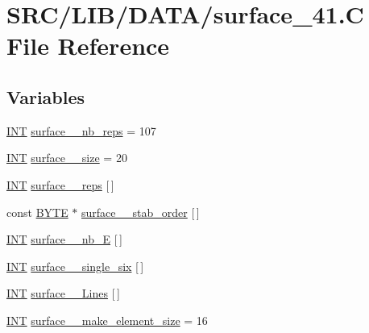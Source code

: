 \hypertarget{surface__41_8_c}{}\section{S\+R\+C/\+L\+I\+B/\+D\+A\+T\+A/surface\+\_\+41.C File Reference}
\label{surface__41_8_c}
\subsection*{Variables}
\begin{DoxyCompactItemize}
\item 
\mbox{\hyperlink{galois_8h_a09fddde158a3a20bd2dcadb609de11dc}{I\+NT}} \mbox{\hyperlink{surface__41_8_c_afb3c710b0a38cd5d7a817c53cffb5504}{surface\+\_\+\_\+nb\+\_\+reps}} = 107
\item 
\mbox{\hyperlink{galois_8h_a09fddde158a3a20bd2dcadb609de11dc}{I\+NT}} \mbox{\hyperlink{surface__41_8_c_a427593e153dddedf2a9f015444f2d298}{surface\+\_\+\_\+size}} = 20
\item 
\mbox{\hyperlink{galois_8h_a09fddde158a3a20bd2dcadb609de11dc}{I\+NT}} \mbox{\hyperlink{surface__41_8_c_a7be9eb6a20b2fcd1669a22e37e74dc1b}{surface\+\_\+\_\+reps}} \mbox{[}$\,$\mbox{]}
\item 
const \mbox{\hyperlink{galois_8h_ab6cc7b4aeb6ea31aba2b3fbfc83ff5e6}{B\+Y\+TE}} $\ast$ \mbox{\hyperlink{surface__41_8_c_a834534f74921072c78c7a682ac12512c}{surface\+\_\+\_\+stab\+\_\+order}} \mbox{[}$\,$\mbox{]}
\item 
\mbox{\hyperlink{galois_8h_a09fddde158a3a20bd2dcadb609de11dc}{I\+NT}} \mbox{\hyperlink{surface__41_8_c_ac1282a5a5512d1cb41af5b8118ec3f75}{surface\+\_\+\_\+nb\+\_\+E}} \mbox{[}$\,$\mbox{]}
\item 
\mbox{\hyperlink{galois_8h_a09fddde158a3a20bd2dcadb609de11dc}{I\+NT}} \mbox{\hyperlink{surface__41_8_c_a6645f57303c0dd2b59053b97b12cf214}{surface\+\_\+\_\+single\+\_\+six}} \mbox{[}$\,$\mbox{]}
\item 
\mbox{\hyperlink{galois_8h_a09fddde158a3a20bd2dcadb609de11dc}{I\+NT}} \mbox{\hyperlink{surface__41_8_c_acd1b79c4fedf6576889e6c509d9c80a6}{surface\+\_\+\_\+\+Lines}} \mbox{[}$\,$\mbox{]}
\item 
\mbox{\hyperlink{galois_8h_a09fddde158a3a20bd2dcadb609de11dc}{I\+NT}} \mbox{\hyperlink{surface__41_8_c_ab81d57e839fb4264e649f72e1faab454}{surface\+\_\+\_\+make\+\_\+element\+\_\+size}} = 16
\item 

\end{DoxyCompactItemize}
